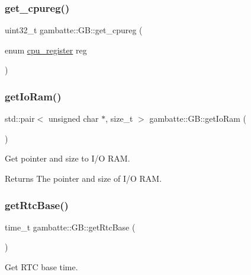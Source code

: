 \subsubsection{\texorpdfstring{get\+\_\+cpureg()}{get\_cpureg()}}
{\footnotesize\ttfamily uint32\+\_\+t gambatte\+::\+G\+B\+::get\+\_\+cpureg (\begin{DoxyParamCaption}\item[{enum \hyperlink{classgambatte_1_1GB_afbfe723d7a5e73582401f77c75d13893}{cpu\+\_\+register}}]{reg }\end{DoxyParamCaption})}

\mbox{\label{classgambatte_1_1GB_af97601bcf082aafab539a6922f36beb8}} 
\subsubsection{\texorpdfstring{get\+Io\+Ram()}{getIoRam()}}
{\footnotesize\ttfamily std\+::pair$<$ unsigned char $\ast$, size\+\_\+t $>$ gambatte\+::\+G\+B\+::get\+Io\+Ram (\begin{DoxyParamCaption}{ }\end{DoxyParamCaption})}

Get pointer and size to I/O R\+AM. \begin{DoxyReturn}{Returns}
The pointer and size of I/O R\+AM. 
\end{DoxyReturn}
\mbox{\label{classgambatte_1_1GB_a8fd5bd2699640686ad21e211ca841c2f}} 
\subsubsection{\texorpdfstring{get\+Rtc\+Base()}{getRtcBase()}}
{\footnotesize\ttfamily time\+\_\+t gambatte\+::\+G\+B\+::get\+Rtc\+Base (\begin{DoxyParamCaption}{ }\end{DoxyParamCaption})}

Get R\+TC base time. \mbox{\label{classgambatte_1_1GB_aef4cbcec5818d26bef8c54cedf007e17}} 
